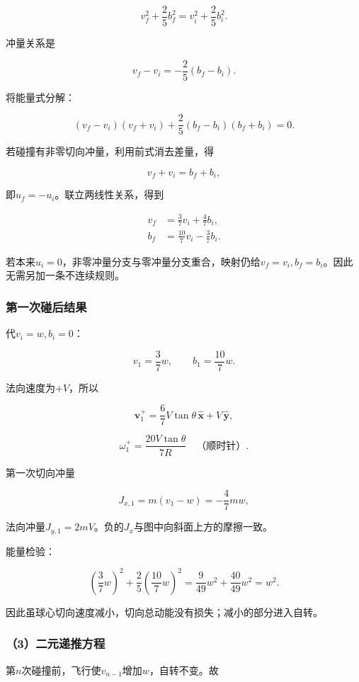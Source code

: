 \documentclass[12pt,a4paper,fontset=fandol]{ctexart}
\begin{document}
\[
v_f^2+\frac25b_f^2
=v_i^2+\frac25b_i^2.
\]

冲量关系是

\[
v_f-v_i=-\frac25(b_f-b_i).
\]

将能量式分解：

\[
(v_f-v_i)(v_f+v_i)
+\frac25(b_f-b_i)(b_f+b_i)=0.
\]

若碰撞有非零切向冲量，利用前式消去差量，得

\[
v_f+v_i=b_f+b_i,
\]

即\(u_f=-u_i\)。联立两线性关系，得到

\[
\boxed{
\begin{aligned}
v_f&=\frac37v_i+\frac47b_i,\\
b_f&=\frac{10}{7}v_i-\frac37b_i.
\end{aligned}}
\]

若本来\(u_i=0\)，非零冲量分支与零冲量分支重合，映射仍给\(v_f=v_i,b_f=b_i\)。因此无需另加一条不连续规则。

\subsubsection{第一次碰后结果}\label{ux7b2cux4e00ux6b21ux78b0ux540eux7ed3ux679c}

代\(v_i=w,b_i=0\)：

\[
v_1=\frac37w,\qquad
b_1=\frac{10}{7}w.
\]

法向速度为\(+V\)，所以

\[
\boxed{
\boldsymbol v_1^+
=\frac67V\tan\theta\,\hat{\boldsymbol x}
+V\,\hat{\boldsymbol y}},
\]

\[
\boxed{\omega_1^+=\frac{20V\tan\theta}{7R}}
\quad\text{（顺时针）}.
\]

第一次切向冲量

\[
J_{x,1}=m(v_1-w)=-\frac47mw,
\]

法向冲量\(J_{y,1}=2mV\)。负的\(J_x\)与图中向斜面上方的摩擦一致。

能量检验：

\[
\left(\frac37w\right)^2
+\frac25\left(\frac{10}{7}w\right)^2
=\frac9{49}w^2+\frac{40}{49}w^2=w^2.
\]

因此虽球心切向速度减小，切向总动能没有损失；减小的部分进入自转。

\subsubsection{（3）二元递推方程}\label{ux4e8cux5143ux9012ux63a8ux65b9ux7a0b}

第\(n\)次碰撞前，飞行使\(v_{n-1}\)增加\(w\)，自转不变。故
\end{document}
